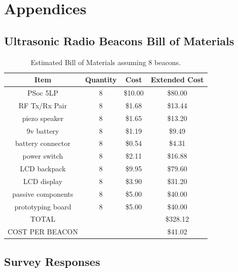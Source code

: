 \documentclass{article}
\begin{document}




\section{Appendices}

  \subsection{Ultrasonic Radio Beacons Bill of Materials} \label{appendix:beacon_bom}

    \begin{table}[H]
      \centering
      \begin{tabular}{|c|c|c|c|} \hline
        Item & Quantity & Cost & Extended Cost \\ \hline
        PSoc 5LP & 8 & \$10.00 & \$80.00 \\ \hline
        RF Tx/Rx Pair & 8 & \$1.68 & \$13.44 \\ \hline
        piezo speaker & 8 & \$1.65 & \$13.20 \\ \hline
        9v battery & 8 & \$1.19 & \$9.49 \\ \hline
        battery connector & 8 & \$0.54 & \$4.31 \\ \hline
        power switch & 8 & \$2.11 & \$16.88 \\ \hline
        LCD backpack & 8 & \$9.95 & \$79.60 \\ \hline
        LCD display & 8 & \$3.90 & \$31.20 \\ \hline
        passive components & 8 & \$5.00 & \$40.00 \\ \hline
        prototyping board & 8 & \$5.00 & \$40.00 \\ \hline
        TOTAL & & & \$328.12 \\ \hline
        COST PER BEACON & & & \$41.02 \\ \hline
      \end{tabular}
      \caption{Estimated Bill of Materials assuming 8 beacons.}
      \label{table:beacon_bom}
    \end{table}

  \subsection{Survey Responses}\label{appendix:survey}
\end{document}
